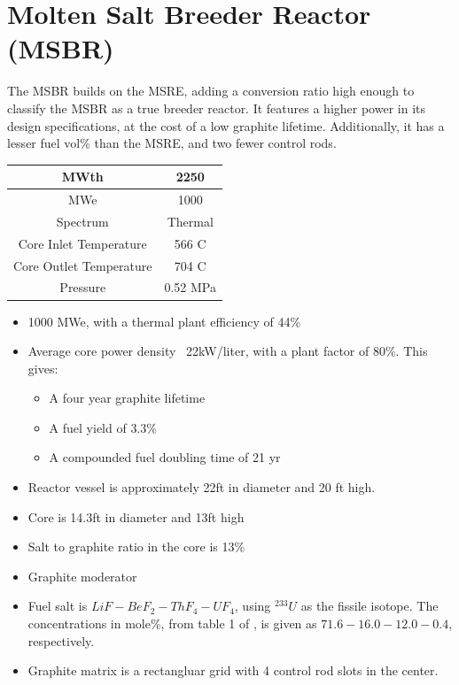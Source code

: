 \documentclass[letterpaper]{article}
\begin{document}
\section{Molten Salt Breeder Reactor (MSBR)}
The MSBR builds on the MSRE, adding a conversion ratio high enough to classify the MSBR as a true breeder reactor.  It features a higher power in its design specifications, at the cost of a low graphite lifetime.  Additionally, it has a lesser fuel vol\% than the MSRE, and two fewer control rods.

\begin{center}
\begin{tabular}{|c|c|}
\hline
MWth & 2250 \\
\hline
MWe & 1000 \\
\hline
Spectrum & Thermal \\
\hline
Core Inlet Temperature & 566 C \\
\hline
Core Outlet Temperature & 704 C\\
\hline
Pressure & 0.52 MPa \\
\hline
\end{tabular}
\end{center}

\begin{itemize}
\item 1000 MWe, with a thermal plant efficiency of 44\%
\item Average core power density ~22kW/liter, with a plant factor of 80\%.  This gives:
	\begin{itemize}
	\item A four year graphite lifetime
	\item A fuel yield of 3.3\%
	\item A compounded fuel doubling time of 21 yr
	\end{itemize}
\item Reactor vessel is approximately 22ft in diameter and 20 ft high.
\item Core is 14.3ft in diameter and 13ft high
\item Salt to graphite ratio in the core is 13\%
\item Graphite moderator
\item Fuel salt is $LiF - BeF_2 - ThF_4 - UF_4$, using ${}^{233}U$ as the fissile isotope.  The concentrations in mole\%, from table 1 of \cite{bettis_design_1970}, is given as $71.6 - 16.0 - 12.0 - 0.4$, respectively.
\item Graphite matrix is a rectangluar grid with 4 control rod slots in the center.
\end{itemize}
\end{document}
